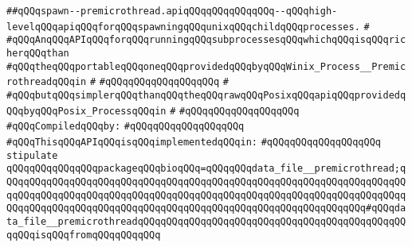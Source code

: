\label{src/lib/std/src/posix/spawn--premicrothread.api}
\verb|##qQQqspawn--premicrothread.apiqQQqqQQqqQQqqQQq--qQQqhigh-levelqQQqapiqQQqforqQQqspawningqQQqunixqQQqchildqQQqprocesses.|\newline
\verb|#|\newline
\verb|#qQQqAnqQQqAPIqQQqforqQQqrunningqQQqsubprocessesqQQqwhichqQQqisqQQqricherqQQqthan|\newline
\verb|#qQQqtheqQQqportableqQQqoneqQQqprovidedqQQqbyqQQqWinix_Process__PremicrothreadqQQqin|\newline
\verb|#|\newline
\verb|#qQQqqQQqqQQqqQQqqQQq|\newline
\verb|#|\newline
\verb|#qQQqbutqQQqsimplerqQQqthanqQQqtheqQQqrawqQQqPosixqQQqapiqQQqprovidedqQQqbyqQQqPosix_ProcessqQQqin|\newline
\verb|#|\newline
\verb|#qQQqqQQqqQQqqQQqqQQq|\newline
\newline
\verb|#qQQqCompiledqQQqby:|\newline
\verb|#qQQqqQQqqQQqqQQqqQQq|\newline
\newline
\newline
\newline
\verb|#qQQqThisqQQqAPIqQQqisqQQqimplementedqQQqin:|\newline
\verb|#qQQqqQQqqQQqqQQqqQQq|\newline
\newline
\verb|stipulate|\newline
\verb|qQQqqQQqqQQqqQQqpackageqQQqbioqQQq=qQQqqQQqdata_file__premicrothread;qQQqqQQqqQQqqQQqqQQqqQQqqQQqqQQqqQQqqQQqqQQqqQQqqQQqqQQqqQQqqQQqqQQqqQQqqQQqqQQqqQQqqQQqqQQqqQQqqQQqqQQqqQQqqQQqqQQqqQQqqQQqqQQqqQQqqQQqqQQqqQQqqQQqqQQqqQQqqQQqqQQqqQQqqQQqqQQqqQQqqQQqqQQqqQQqqQQqqQQqqQQq#qQQqdata_file__premicrothreadqQQqqQQqqQQqqQQqqQQqqQQqqQQqqQQqqQQqqQQqqQQqqQQqqQQqisqQQqfromqQQqqQQqqQQq|\newline
